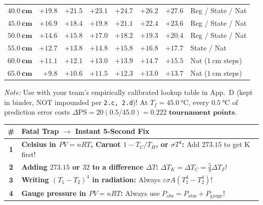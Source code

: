 \documentclass[10pt,twoside,openany,letterpaper]{book}
\begin{document}
\begin{quicksheet}
\begin{twocol}[0.51]
\begin{devicebox}
\begin{tabularx}{\linewidth}{@{}l | r r r r r r | X@{}}
\midrule
$\mathbf{\SI{40.0}{\centi\meter}}$ & $+19.8$ & $+21.5$ & $+23.1$ & $+24.7$ & $+26.2$ & $+27.6$ & Reg / State / Nat \\
$\mathbf{\SI{45.0}{\centi\meter}}$ & $+16.9$ & $+18.4$ & $+19.8$ & $+21.1$ & $+22.4$ & $+23.6$ & Reg / State / Nat \\
$\mathbf{\SI{50.0}{\centi\meter}}$ & $+14.6$ & $+15.8$ & $+17.0$ & $+18.2$ & $+19.3$ & $+20.4$ & Reg / State / Nat \\
$\mathbf{\SI{55.0}{\centi\meter}}$ & $+12.7$ & $+13.8$ & $+14.8$ & $+15.8$ & $+16.8$ & $+17.7$ & State / Nat \\
$\mathbf{\SI{60.0}{\centi\meter}}$ & $+11.1$ & $+12.1$ & $+13.0$ & $+13.9$ & $+14.7$ & $+15.5$ & Nat ($\SI{1}{\centi\meter}$ steps) \\
$\mathbf{\SI{65.0}{\centi\meter}}$ & $+9.8$ & $+10.6$ & $+11.5$ & $+12.3$ & $+13.0$ & $+13.7$ & Nat ($\SI{1}{\centi\meter}$ steps) \\
\bottomrule
\end{tabularx}
\par\vspace{1pt}\raggedright{\scriptsize \emph{Note:} Use with your team's empirically calibrated lookup table in App.~D (kept in binder, NOT impounded per \texttt{2.c, 2.d})! At $T_f = \SI{45.0}{\celsius}$, every $\SI{0.5}{\celsius}$ of prediction error costs $\Delta\mathrm{PS} = 20(0.5/45.0) = \mathbf{0.222\text{ tournament points}}$.}
\end{devicebox}
\nextcol[0.47]
\begin{trapbox}
\par\smallskip\noindent
\scriptsize\setlength{\tabcolsep}{2.2pt}\renewcommand{\arraystretch}{1.07}
\begin{tabularx}{\linewidth}{@{}c X@{}}
\toprule
\textbf{\#} & \textbf{Fatal Trap $\to$ Instant 5-Second Fix} \\
\midrule
\textbf{1} & \textbf{Celsius in $PV=nRT$, Carnot $1-T_C/T_H$, or $\sigma T^4$:} Add $273.15$ to get $\si{\kelvin}$ first! \\
\textbf{2} & \textbf{Adding $273.15$ or $32$ to a difference $\Delta T$:} $\Delta T_K = \Delta T_C = \frac{5}{9}\Delta T_F$! \\
\textbf{3} & \textbf{Writing $(T_1 - T_2)^4$ in radiation:} Always $\varepsilon\sigma A(T_1^4 - T_2^4)$! \\
\textbf{4} & \textbf{Gauge pressure in $PV=nRT$:} Always use $P_{\mathrm{abs}} = P_{\mathrm{atm}} + P_{\mathrm{gauge}}$! \\

\end{tabularx}
\end{trapbox}
\end{twocol}
\end{quicksheet}
\end{document}
